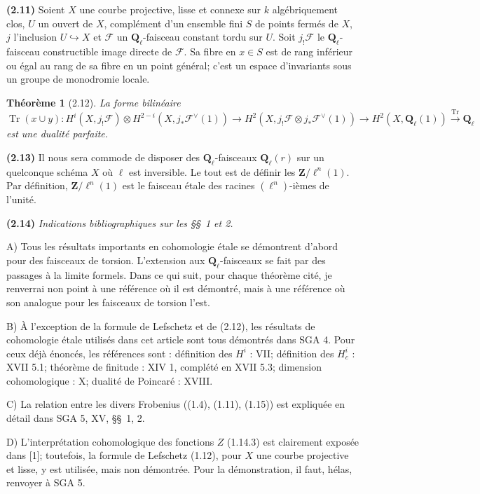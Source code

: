 \documentclass[12pt,a4paper]{amsart}
\theoremstyle{plain}
\newtheorem{theoreme}{Th\'eor\`eme}[section]
\theoremstyle{definition}
\theoremstyle{remark}
\DeclareMathOperator{\Tr}{Tr}
\newcommand{\Q}{\mathbf{Q}}
\newcommand{\Z}{\mathbf{Z}}
\numberwithin{equation}{section}
\begin{document}
\noindent \textbf{(2.11)} Soient $X$ une courbe projective, lisse et connexe sur $k$ alg\'ebriquement clos, $U$ un ouvert de $X$, compl\'ement d'un ensemble fini $S$ de points ferm\'es de $X$, $j$ l'inclusion $U\hookrightarrow X$ et $\mathscr{F}$ un $\Q_\ell$-faisceau constant tordu sur $U$. Soit $j_!\mathscr{F}$ le $\Q_\ell$-faisceau constructible image directe de $\mathscr{F}$. Sa fibre en $x\in S$ est de rang inf\'erieur ou \'egal au rang de sa fibre en un point g\'en\'eral; c'est un espace d'invariants sous un groupe de monodromie locale.

\begin{theoreme}[2.12]\label{thm:2.12}
La forme bilin\'eaire
\[
\Tr(x\cup y) : H^i(X,j_!\mathscr{F}) \otimes H^{2-i}(X,j_\ast\mathscr{F}^\vee(1)) \longrightarrow H^2(X,j_!\mathscr{F}\otimes j_\ast\mathscr{F}^\vee(1)) \longrightarrow H^2(X,\Q_\ell(1)) \xrightarrow{\Tr} \Q_\ell
\]
est une dualit\'e parfaite.
\end{theoreme}

\noindent \textbf{(2.13)} Il nous sera commode de disposer des $\Q_\ell$-faisceaux $\Q_\ell(r)$ sur un quelconque sch\'ema $X$ o\`u $\ell$ est inversible. Le tout est de d\'efinir les $\Z/\ell^n(1)$. Par d\'efinition, $\Z/\ell^n(1)$ est le faisceau \'etale des racines $(\ell^n)$-i\`emes de l'unit\'e.

\noindent \textbf{(2.14)} \textit{Indications bibliographiques sur les \S\S\ 1 et 2.}

\noindent A) Tous les r\'esultats importants en cohomologie \'etale se d\'emontrent d'abord pour des faisceaux de torsion. L'extension aux $\Q_\ell$-faisceaux se fait par des passages \`a la limite formels. Dans ce qui suit, pour chaque th\'eor\`eme cit\'e, je renverrai non point \`a une r\'ef\'erence o\`u il est d\'emontr\'e, mais \`a une r\'ef\'erence o\`u son analogue pour les faisceaux de torsion l'est.

\noindent B) \`A l'exception de la formule de Lefschetz et de (2.12), les r\'esultats de cohomologie \'etale utilis\'es dans cet article sont tous d\'emontr\'es dans SGA 4. Pour ceux d\'ej\`a \'enonc\'es, les r\'ef\'erences sont : d\'efinition des $H^i$ : VII; d\'efinition des $H^i_c$ : XVII 5.1; th\'eor\`eme de finitude : XIV 1, compl\'et\'e en XVII 5.3; dimension cohomologique : X; dualit\'e de Poincar\'e : XVIII.

\noindent C) La relation entre les divers Frobenius ((1.4), (1.11), (1.15)) est expliqu\'ee en d\'etail dans SGA 5, XV, \S\S\ 1, 2.

\noindent D) L'interpr\'etation cohomologique des fonctions $Z$ (1.14.3) est clairement expos\'ee dans [1]; toutefois, la formule de Lefschetz (1.12), pour $X$ une courbe projective et lisse, y est utilis\'ee, mais non d\'emontr\'ee. Pour la d\'emonstration, il faut, h\'elas, renvoyer \`a SGA 5.
\end{document}

